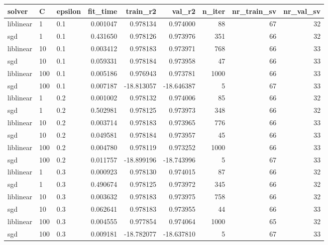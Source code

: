 \begin{tabular}{lllrrrrrr}
\toprule
   solver &   C & epsilon &  fit\_time &   train\_r2 &     val\_r2 &  n\_iter &  nr\_train\_sv &  nr\_val\_sv \\
\midrule
liblinear &   1 &     0.1 &  0.001047 &   0.978134 &   0.974000 &      88 &           67 &         32 \\
      sgd &   1 &     0.1 &  0.431650 &   0.978126 &   0.973976 &     351 &           66 &         32 \\
liblinear &  10 &     0.1 &  0.003412 &   0.978183 &   0.973971 &     768 &           66 &         33 \\
      sgd &  10 &     0.1 &  0.059331 &   0.978184 &   0.973958 &      47 &           66 &         33 \\
liblinear & 100 &     0.1 &  0.005186 &   0.976943 &   0.973781 &    1000 &           66 &         33 \\
      sgd & 100 &     0.1 &  0.007187 & -18.813057 & -18.646387 &       5 &           67 &         33 \\
liblinear &   1 &     0.2 &  0.001002 &   0.978132 &   0.974006 &      85 &           66 &         32 \\
      sgd &   1 &     0.2 &  0.502981 &   0.978125 &   0.973973 &     348 &           66 &         32 \\
liblinear &  10 &     0.2 &  0.003714 &   0.978183 &   0.973965 &     776 &           66 &         33 \\
      sgd &  10 &     0.2 &  0.049581 &   0.978184 &   0.973957 &      45 &           66 &         33 \\
liblinear & 100 &     0.2 &  0.004780 &   0.978119 &   0.973252 &    1000 &           66 &         33 \\
      sgd & 100 &     0.2 &  0.011757 & -18.899196 & -18.743996 &       5 &           67 &         33 \\
liblinear &   1 &     0.3 &  0.000923 &   0.978130 &   0.974015 &      87 &           66 &         32 \\
      sgd &   1 &     0.3 &  0.490674 &   0.978125 &   0.973972 &     345 &           66 &         32 \\
liblinear &  10 &     0.3 &  0.003632 &   0.978183 &   0.973975 &     758 &           66 &         32 \\
      sgd &  10 &     0.3 &  0.062641 &   0.978183 &   0.973955 &      44 &           66 &         33 \\
liblinear & 100 &     0.3 &  0.004555 &   0.977854 &   0.974064 &    1000 &           65 &         32 \\
      sgd & 100 &     0.3 &  0.009181 & -18.782077 & -18.637810 &       5 &           67 &         33 \\
\bottomrule
\end{tabular}
